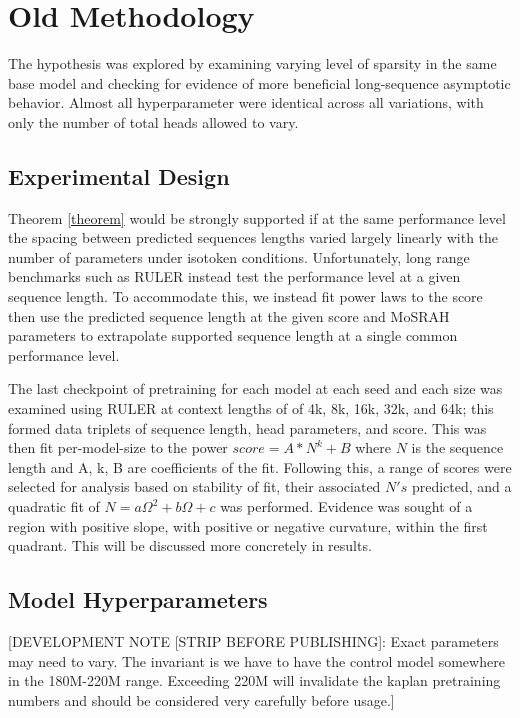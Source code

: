 \documentclass[11pt]{article}
\begin{document}
\section{Old Methodology}

The hypothesis was explored by examining varying level of sparsity in the same base model and checking for evidence of more beneficial long-sequence asymptotic behavior. Almost all hyperparameter were identical across all variations, with only the number of total heads allowed to vary.

\subsection{Experimental Design}

Theorem \ref{theorem} would be strongly supported if at the same performance level the spacing between predicted sequences lengths varied largely linearly with the number of parameters under isotoken conditions. Unfortunately, long range benchmarks such as RULER instead test the performance level at a given sequence length. To accommodate this, we instead fit power laws to the score then use the predicted sequence length at the given score and MoSRAH parameters to extrapolate supported sequence length at a single common performance level.

The last checkpoint of pretraining for each model at each seed and each size was examined using RULER at context lengths of of 4k, 8k, 16k, 32k, and 64k; this formed data triplets of sequence length, head parameters, and score. This was then fit per-model-size to the power $score = A*N^{k}+B$ where $N$ is the sequence length and A, k, B are coefficients of the fit. Following this, a range of scores were selected for analysis based on stability of fit,  their associated $N's$ predicted, and a quadratic fit of $N = a\Omega^2 + b\Omega + c$ was performed. Evidence was sought of a region with positive slope, with positive or negative curvature, within the first quadrant. This will be discussed more concretely in results.

\subsection{Model Hyperparameters}
\label{app:hyperparameters}

[DEVELOPMENT NOTE [STRIP BEFORE PUBLISHING]: Exact parameters may need to vary. The invariant is we have to have the control model somewhere in the 180M-220M range. Exceeding 220M will invalidate the kaplan pretraining numbers and should be considered very carefully before usage.]
\end{document}
